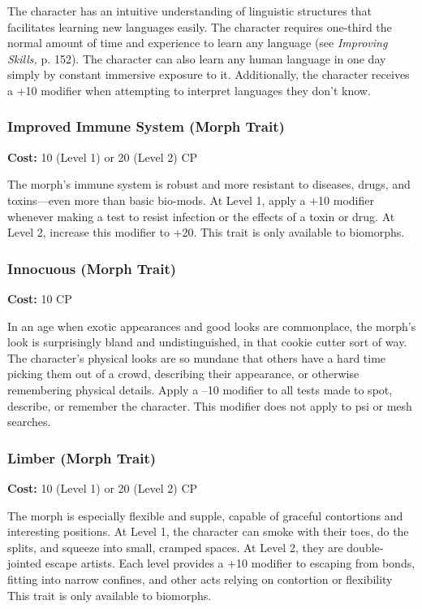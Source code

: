 The character has an intuitive understanding of 
linguistic structures that facilitates learning new 
languages easily. The character requires one-third the 
normal amount of time and experience to learn any 
language (see \textit{Improving Skills,} p. 152). The character 
can also learn any human language in one day simply 
by constant immersive exposure to it. Additionally, 
the character receives a +10 modifier when attempting 
to interpret languages they don't know.

\subsubsection{Improved Immune System (Morph Trait)}

\textbf{Cost:} 10 (Level 1) or 20 (Level 2) CP

The morph's immune system is robust and more 
resistant to diseases, drugs, and toxins—even more 
than basic bio-mods. At Level 1, apply a +10 modifier 
whenever making a test to resist infection or the effects 
of a toxin or drug. At Level 2, increase this modifier to 
+20. This trait is only available to biomorphs.

\subsubsection{Innocuous (Morph Trait)}

\textbf{Cost:} 10 CP

In an age when exotic appearances and good looks 
are commonplace, the morph's look is surprisingly 
bland and undistinguished, in that cookie cutter sort of 
way. The character's physical looks are so mundane that 
others have a hard time picking them out of a crowd, 
describing their appearance, or otherwise remembering
physical details. Apply a –10 modifier to all tests
made to spot, describe, or remember the character. This 
modifier does not apply to psi or mesh searches.

\subsubsection{Limber (Morph Trait)}

\textbf{Cost:} 10 (Level 1) or 20 (Level 2) CP

The morph is especially flexible and supple, capable of 
graceful contortions and interesting positions. At Level 
1, the character can smoke with their toes, do the splits, 
and squeeze into small, cramped spaces. At Level 2, they 
are double-jointed escape artists. Each level provides a 
+10 modifier to escaping from bonds, fitting into narrow 
confines, and other acts relying on contortion or flexibility
This trait is only available to biomorphs.

